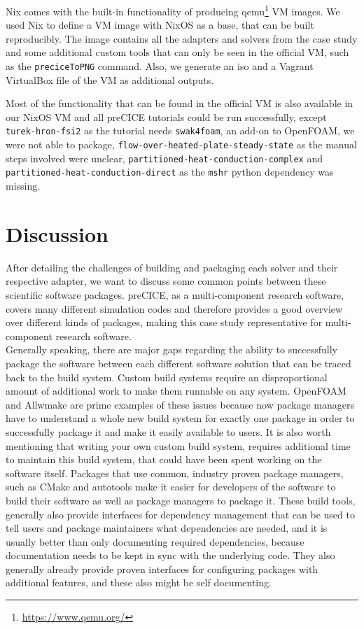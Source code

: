 \documentclass{eceasst}
\begin{document}
Nix comes with the built-in functionality of producing qemu\footnote{\url{https://www.qemu.org/}} VM images.
We used Nix to define a VM image with NixOS as a base, that can be built reproducibly.
The image contains all the adapters and solvers from the case study and some additional custom tools that can only be seen in the official VM, such as the \texttt{preciceToPNG} command.
Also, we generate an iso and a Vagrant VirtualBox file of the VM as additional outputs.

\begin{sloppypar}
Most of the functionality that can be found in the official VM is also available in our NixOS VM and all preCICE tutorials could be run successfully, except \texttt{turek-hron-fsi2} as the tutorial needs \texttt{swak4foam}, an add-on to OpenFOAM, we were not able to package, \texttt{flow-over-heated-plate-steady-state} as the manual steps involved were unclear, \texttt{partitioned-heat-conduction-complex} and \texttt{partitioned-heat-conduction-direct} as the \texttt{mshr} python dependency was missing.
\end{sloppypar}

\section{Discussion}

After detailing the challenges of building and packaging each solver and their respective adapter, we want to discuss some common points between these scientific software packages.
preCICE, as a multi-component research software, covers many different simulation codes and therefore provides a good overview over different kinds of packages, making this case study representative for multi-component research software.\\

Generally speaking, there are major gaps regarding the ability to successfully package the software between each different software solution that can be traced back to the build system.
Custom build systems require an disproportional amount of additional work to make them runnable on any system.
OpenFOAM and Allwmake are prime examples of these issues because now package managers have to understand a whole new build system for exactly one package in order to successfully package it and make it easily available to users.
It is also worth mentioning that writing your own custom build system, requires additional time to maintain this build system, that could have been spent working on the software itself.
Packages that use common, industry proven package managers, such as CMake and autotools make it easier for developers of the software to build their software as well as package managers to package it.
These build tools, generally also provide interfaces for dependency management that can be used to tell users and package maintainers what dependencies are needed, and it is usually better than only documenting required dependencies, because documentation needs to be kept in sync with the underlying code.
They also generally already provide proven interfaces for configuring packages with additional features, and these also might be self documenting.
\end{document}
